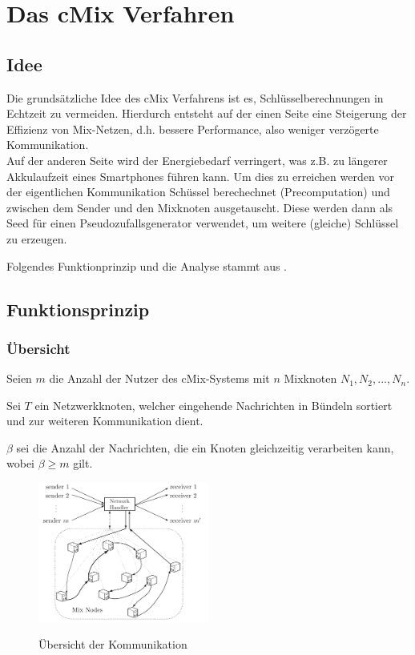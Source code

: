\documentclass[
    fontsize=12pt,
    headings=small,
    parskip=half,           %
    bibliography=totoc,
    numbers=noenddot,       %
    open=any,               %
    final                   %
    ]{scrreprt}
\begin{document}
\chapter{Das cMix Verfahren}

\section{Idee}

Die grundsätzliche Idee des cMix Verfahrens ist es, Schlüsselberechnungen in Echtzeit zu vermeiden. Hierdurch entsteht auf 
der einen Seite eine Steigerung der Effizienz von Mix-Netzen, d.h. bessere Performance, also weniger verzögerte Kommunikation. \\  Auf der anderen Seite wird
 der Energiebedarf verringert, was z.B. zu längerer Akkulaufzeit eines Smartphones führen kann.
 Um dies zu erreichen werden vor der eigentlichen Kommunikation Schüssel berechechnet (Precomputation) und zwischen dem Sender und den Mixknoten ausgetauscht.
 Diese werden dann als Seed für einen Pseudozufallsgenerator verwendet, um weitere (gleiche) Schlüssel zu erzeugen.
 
Folgendes Funktionprinzip und die Analyse stammt aus \cite{DBLP:journals/iacr/DavidChaumJKKRS16}.


\section{Funktionsprinzip}
\subsection{Übersicht}
Seien $m$ die Anzahl der Nutzer des cMix-Systems mit $n$ Mixknoten $N_1, N_2, ... ,  N_n$. 

Sei $T$ ein Netzwerkknoten, welcher eingehende Nachrichten in Bündeln sortiert und zur weiteren Kommunikation dient.

$\beta$ sei die Anzahl der Nachrichten, die ein Knoten gleichzeitig verarbeiten kann, wobei $\beta \geq m$ gilt.

\begin{figure}[h]
 \caption{Übersicht der Kommunikation}
\includegraphics[width=0.5\textwidth]{Bilder/commu_model.png} \label{graphic:commu}
\end{figure}
\end{document}
